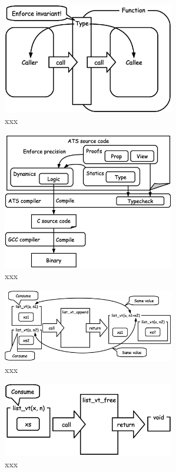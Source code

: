 \documentclass{ipsjprosym}
\begin{document}
\begin{figure}[h]
\centering
\includegraphics[width=75mm]{draw/enforce_invariant.eps}
\caption{xxx}
\label{fig:enforce_invariant}
\end{figure}

\begin{figure}[h]
\centering
\includegraphics[width=75mm]{draw/flow.eps}
\caption{xxx}
\label{fig:flow}
\end{figure}

\begin{figure}[h]
\centering
\includegraphics[width=75mm]{draw/list_vt_append.eps}
\caption{xxx}
\label{fig:list_vt_append}
\end{figure}

\begin{figure}[h]
\centering
\includegraphics[width=75mm]{draw/list_vt_free.eps}
\caption{xxx}
\label{fig:xxx}
\end{figure}
\end{document}
